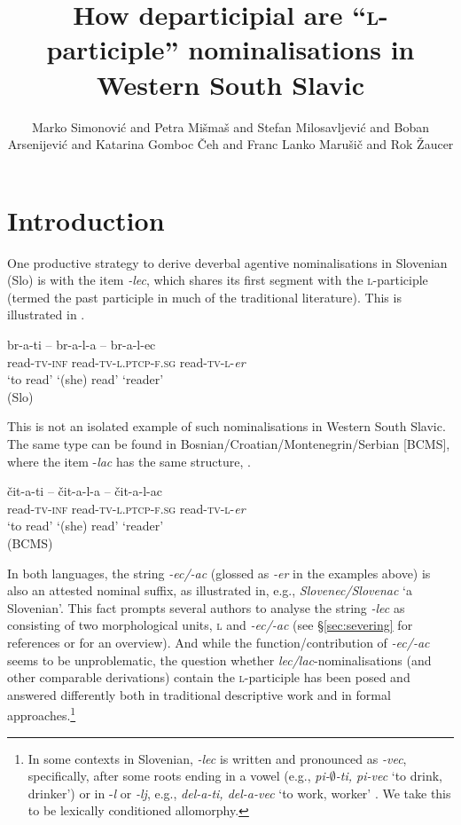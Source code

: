 \documentclass[output=paper,colorlinks,citecolor=brown]{langscibook}
\author{Marko Simonović\orcid{0000-0002-9651-6399}\affiliation{University of Graz} and 
 Petra Mišmaš\orcid{0000-0001-8659-875X}\affiliation{University of Nova Gorica} and 
 Stefan Milosavljević\orcid{0000-0003-2305-2519}\affiliation{University of Graz} and 
 Boban Arsenijević\orcid{0000-0002-1124-6319}\affiliation{University of Graz} and 
Katarina Gomboc Čeh\orcid{}\affiliation{University of Nova Gorica} and 
Franc Lanko Marušič\orcid{0000-0002-0667-3236}\affiliation{University of Nova Gorica} and
Rok Žaucer\orcid{0000-0001-7771-6937}\affiliation{University of Nova Gorica}}
\title[ ``\textsc{l}-participle'' nominalisations]{How departicipial are ``\textsc{l}-participle'' nominalisations in Western South Slavic}
\begin{document}
\maketitle


\section{Introduction}\label{sim+:intro}


One productive strategy to derive deverbal agentive nominalisations in Slovenian (Slo) is with the item \textit{-lec}, which shares its first segment with the \textsc{l}-participle (termed the past participle in much of the traditional literature). This is illustrated in . 


\ea \label{ex:brati}
\glll br-a-ti -- br-a-l-a -- br-a-l-ec %
\\
read-\textsc{tv}-\textsc{inf} {} read-\textsc{tv}-\textsc{l.ptcp}-\textsc{f.sg} {} read-\textsc{tv}-\textsc{l}-\textit{er}  \\
{`to read'} {} {`(she) read'} {} `reader'   \\\hfill (Slo)
\z

\noindent This is not an isolated example of such nominalisations in Western South Slavic. The same type can be found in Bosnian/\-Croatian/\-Montenegrin/Serbian [BCMS], where the item -\textit{lac} has the same structure,  .


\ea \label{ex:citati}
\glll čit-a-ti -- čit-a-l-a -- čit-a-l-ac \\
        read-\textsc{tv}-\textsc{inf} {} read-\textsc{tv}-\textsc{l.ptcp}-\textsc{f.sg} {} read-\textsc{tv}-\textsc{l}-\textit{er}    \\
 {`to read'} {} {`(she) read'} {} `reader'  \\\hfill (BCMS)
 \z

\noindent In both languages, the string \textit{-ec/-ac} (glossed as \textit{-er} in the examples above)  is also an attested nominal suffix, as illustrated in, e.g., \textit{Slovenec/Slovenac} `a Slovenian'. This fact prompts several authors to analyse the string \textit{-lec} as consisting of two morphological units, \textsc{l} and \textit{-ec/-ac} (see \S \ref{sec:severing} for references or \citealt{birtic2008} for an overview). And while the function/contribution of \textit{-ec/-ac} seems to be unproblematic,  the question whether \textit{lec/lac}-nominalisations (and other comparable derivations) contain the \textsc{l}-par\-ti\-cip\-le has been posed and answered differently both in traditional descriptive work and in formal approaches.\footnote{In some contexts in Slovenian, \textit{-lec} is written and pronounced as \textit{-vec}, specifically, after some roots ending in a vowel (e.g., \textit{pi-$\emptyset$-ti, pi-vec} `to drink, drinker') or in -\textit{l} or \textit{-lj}, e.g., \textit{del-a-ti, del-a-vec} `to work, worker' \citep[163--164]{sim+:toporisic2000}. We take this to be lexically conditioned allomorphy. }
\end{document}
